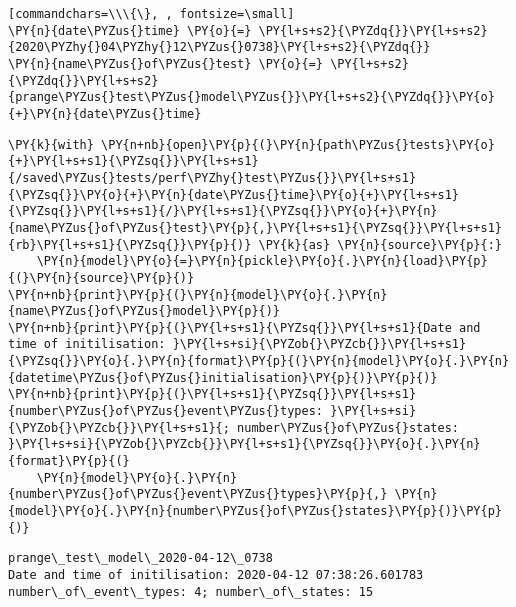 \documentclass[10pt, article,table]{article}
\begin{document}
\begin{tcolorbox}[breakable, size=fbox, boxrule=1pt, pad at break*=1mm,colback=cellbackground, colframe=cellborder]
\begin{Verbatim}[commandchars=\\\{\}, , fontsize=\small]
\PY{n}{date\PYZus{}time} \PY{o}{=} \PY{l+s+s2}{\PYZdq{}}\PY{l+s+s2}{2020\PYZhy{}04\PYZhy{}12\PYZus{}0738}\PY{l+s+s2}{\PYZdq{}}
\PY{n}{name\PYZus{}of\PYZus{}test} \PY{o}{=} \PY{l+s+s2}{\PYZdq{}}\PY{l+s+s2}{prange\PYZus{}test\PYZus{}model\PYZus{}}\PY{l+s+s2}{\PYZdq{}}\PY{o}{+}\PY{n}{date\PYZus{}time}
\end{Verbatim}
\end{tcolorbox}
\begin{tcolorbox}[breakable, size=fbox, boxrule=1pt, pad at break*=1mm,colback=cellbackground, colframe=cellborder]
\begin{Verbatim}[commandchars=\\\{\}, fontsize=\small]
\PY{k}{with} \PY{n+nb}{open}\PY{p}{(}\PY{n}{path\PYZus{}tests}\PY{o}{+}\PY{l+s+s1}{\PYZsq{}}\PY{l+s+s1}{/saved\PYZus{}tests/perf\PYZhy{}test\PYZus{}}\PY{l+s+s1}{\PYZsq{}}\PY{o}{+}\PY{n}{date\PYZus{}time}\PY{o}{+}\PY{l+s+s1}{\PYZsq{}}\PY{l+s+s1}{/}\PY{l+s+s1}{\PYZsq{}}\PY{o}{+}\PY{n}{name\PYZus{}of\PYZus{}test}\PY{p}{,}\PY{l+s+s1}{\PYZsq{}}\PY{l+s+s1}{rb}\PY{l+s+s1}{\PYZsq{}}\PY{p}{)} \PY{k}{as} \PY{n}{source}\PY{p}{:}
    \PY{n}{model}\PY{o}{=}\PY{n}{pickle}\PY{o}{.}\PY{n}{load}\PY{p}{(}\PY{n}{source}\PY{p}{)}
\PY{n+nb}{print}\PY{p}{(}\PY{n}{model}\PY{o}{.}\PY{n}{name\PYZus{}of\PYZus{}model}\PY{p}{)}
\PY{n+nb}{print}\PY{p}{(}\PY{l+s+s1}{\PYZsq{}}\PY{l+s+s1}{Date and time of initilisation: }\PY{l+s+si}{\PYZob{}\PYZcb{}}\PY{l+s+s1}{\PYZsq{}}\PY{o}{.}\PY{n}{format}\PY{p}{(}\PY{n}{model}\PY{o}{.}\PY{n}{datetime\PYZus{}of\PYZus{}initialisation}\PY{p}{)}\PY{p}{)}
\PY{n+nb}{print}\PY{p}{(}\PY{l+s+s1}{\PYZsq{}}\PY{l+s+s1}{number\PYZus{}of\PYZus{}event\PYZus{}types: }\PY{l+s+si}{\PYZob{}\PYZcb{}}\PY{l+s+s1}{; number\PYZus{}of\PYZus{}states: }\PY{l+s+si}{\PYZob{}\PYZcb{}}\PY{l+s+s1}{\PYZsq{}}\PY{o}{.}\PY{n}{format}\PY{p}{(}
    \PY{n}{model}\PY{o}{.}\PY{n}{number\PYZus{}of\PYZus{}event\PYZus{}types}\PY{p}{,} \PY{n}{model}\PY{o}{.}\PY{n}{number\PYZus{}of\PYZus{}states}\PY{p}{)}\PY{p}{)}
\end{Verbatim}
\end{tcolorbox}
\begin{tcolorbox}[breakable, size=fbox, boxrule=.5pt, pad at break*=1mm, opacityfill=0]
\begin{Verbatim}[commandchars=\\\{\}, fontsize=\small]
prange\_test\_model\_2020-04-12\_0738
Date and time of initilisation: 2020-04-12 07:38:26.601783
number\_of\_event\_types: 4; number\_of\_states: 15
    \end{Verbatim}
\end{tcolorbox}
\end{document}

